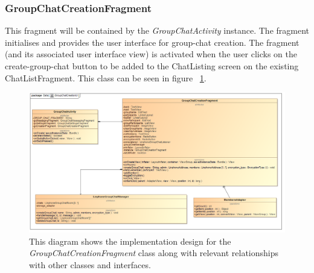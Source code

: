 \documentclass[11pt]{article}
\begin{document}
\subsubsection{GroupChatCreationFragment}
This fragment will be contained by the \textit{GroupChatActivity} instance. The fragment initialises and provides the user interface for group-chat creation. The fragment (and its associated user interface view) is activated when the user clicks on the create-group-chat button to be added to the ChatListing screen on the existing ChatListFragment. This class can be seen in figure ~\ref{cd-group-chat-creation-ui}.
\begin{figure}[H]
\centering
\centerline{\includegraphics[width=7in]{./images/class_groupchat_creation_ui.png}}
\caption[Android Group Chat Creation UI Class Diagram]{This diagram shows the implementation design for the \textit{GroupChatCreationFragment} class along with relevant relationships with other classes and interfaces.}
\label{cd-group-chat-creation-ui}
\end{figure}
\end{document}
